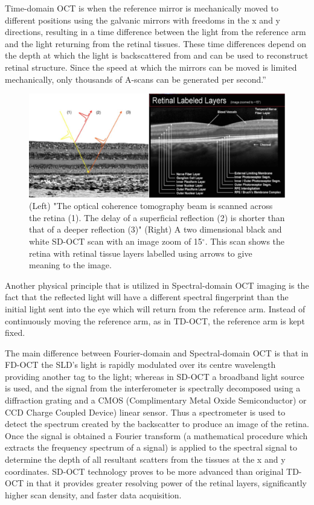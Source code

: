 Time-domain OCT is when the reference mirror is mechanically moved to different
positions using the galvanic mirrors with freedoms in the x and y directions,
resulting in a time difference between the light from the reference arm and the
light returning from the retinal tissues.  These time differences depend on the
depth at which the light is backscattered from and can be used to reconstruct
retinal structure.  Since the speed at which the mirrors can be moved is limited
mechanically, only thousands of A-scans can be generated per second.” \cite{mbib_4}

\begin{figure}[htbp]
\centering
\includegraphics{figures/morgan_4}
\caption{(Left) "The optical coherence tomography beam is scanned across the retina (1).
The delay of a superficial reflection (2) is shorter than that of a deeper reflection (3)" (Right) A two dimensional black and white SD-OCT scan with an image zoom of 15$^\circ$.\cite{mbib_6}  This scan shows the retina with retinal
tissue layers labelled using arrows to give meaning to the image.\cite{mbib_8} }
\label{fig:m_4}
\end{figure}

Another physical principle that is utilized in Spectral-domain OCT imaging is the
fact that the reflected light will have a different spectral fingerprint than the
initial light sent into the eye which will return from the reference arm.  Instead
of continuously moving the reference arm, as in TD-OCT, the reference arm is kept
fixed.

The main difference between Fourier-domain and Spectral-domain OCT is that in
FD-OCT the SLD’s light is rapidly modulated over its centre wavelength providing
another tag to the light; whereas in SD-OCT a broadband light source is used,
and the signal from the interferometer is spectrally decomposed using a diffraction
grating and a CMOS (Complimentary Metal Oxide Semiconductor) or CCD
Charge Coupled Device) linear sensor.\cite{mbib_4}
Thus a spectrometer is used to detect the spectrum created by the backscatter
to produce an image of the retina.  Once the signal is obtained a Fourier transform
(a mathematical procedure which extracts the frequency spectrum of a signal) is
applied to the spectral signal to determine the depth of all resultant scatters from
the tissues at the x and y coordinates.\cite{mbib_4,mbib_9} SD-OCT technology
proves to be more advanced than original TD-OCT in that it provides greater
resolving power of the retinal layers, significantly higher scan density, and faster
data acquisition. \cite{mbib_2}


